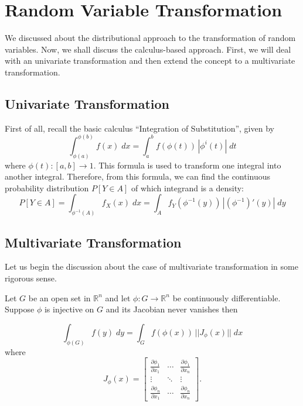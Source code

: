 \documentclass[twoside]{article}
\theoremstyle{definition}
\theoremstyle{remark}
\theoremstyle{remark}
\begin{document}
\section{Random Variable Transformation}
We discussed about the distributional approach to the transformation of random
variables. Now, we shall discuss the calculus-based approach. First, we will deal
with an univariate transformation and then extend the concept to a multivariate
transformation.

\subsection{Univariate Transformation}
First of all, recall the basic calculus ``Integration of Substitution'',
given by
\begin{equation}
  \int_{\phi(a)}^{\phi(b)} f(x) \; dx
  = \int_{a}^{b} f(\phi(t)) \,|\phi^i(t)| \;dt
\end{equation}
where $\phi(t): [a,b] \rightarrow 1$. This formula is used to transform one
integral into another integral. Therefore, from this formula, we can find the
continuous probability distribution $P[Y \in A]$ of which integrand is a density:
\begin{equation}
  P[Y \in A] = \int_{\phi^{-1}(A)} f_X(x) \;dx
  = \int_A f_Y(\phi^{-1}(y))\,|(\phi^{-1})' (y)| \;dy
\end{equation}

\subsection{Multivariate Transformation}
Let us begin the discussion about the case of multivariate transformation in
some rigorous sense.

Let $G$ be an open set in $\mathbb{R}^n$ and let $\phi:G \rightarrow \mathbb{R}^n$
be continuously differentiable. Suppose $\phi$ is injective on $G$ and its
Jacobian never vanishes then

\begin{equation}
  \int_{\phi(G)} f(y) \;dy = \int_{G} f(\phi(x)) \, ||J_{\phi}(x)||\;dx
\end{equation}
where
\begin{equation}
  J_\phi (x) =
    \begin{bmatrix}
      \frac{\partial \phi_1}{\partial x_1} & \cdots & \frac{\partial \phi_1}{\partial x_n} \\
      \vdots & \ddots & \vdots \\
      \frac{\partial \phi_n}{\partial x_1} & \cdots & \frac{\partial \phi_n}{\partial x_n}
    \end{bmatrix}
    .
\end{equation}
\end{document}
